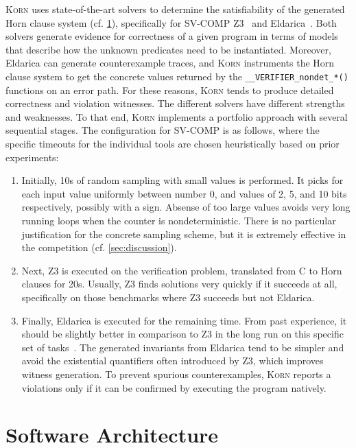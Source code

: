 \documentclass{llncs}
\newcommand{\Korn}{\textsc{Korn}\xspace}
\begin{document}
\Korn uses state-of-the-art solvers to determine the satisfiability of the generated Horn clause system (cf. \cref{sec:architecture}),
specifically for SV-COMP Z3~\cite{bjorner2013solving} and Eldarica~\cite{hojjat2018eldarica}.
Both solvers generate evidence for correctness of a given program in terms of models that describe how the unknown predicates need to be instantiated.
Moreover, Eldarica can generate counterexample traces, and \Korn instruments the Horn clause system to get
the concrete values returned by the \texttt{\_\_VERIFIER\_nondet\_*()} functions on an error path.
For these reasons, \Korn tends to produce detailed correctness and violation witnesses.
%
The different solvers have different strengths and weaknesses.
To that end, \Korn implements a portfolio approach with several sequential stages.
The configuration for SV-COMP is as follows,
where the specific timeouts for the individual tools are chosen heuristically based
on prior experiments:
\begin{enumerate}
    \item Initially, 10s of random sampling with small values is performed.
          It picks for each input value uniformly between number 0, and values of 2, 5, and 10 bits respectively, possibly with a sign.
          Absense of too large values avoids very long running loops
          when the counter is nondeterministic.
          There is no particular justification for the concrete sampling scheme,
          but it is extremely effective in the competition (cf. \cref{sec:discussion}).
    \item Next, Z3 is executed on the verification problem, translated from C to Horn clauses for 20s. Usually, Z3 finds solutions very quickly if it succeeds at all,
          specifically on those benchmarks where Z3 succeeds but not Eldarica.
    \item Finally, Eldarica is executed for the remaining time.
          From past experience, it should be slightly better in comparison to Z3 in the long run on this specific set of tasks~\cite{ernst:arxiv2020:summaries}.
    The generated invariants from Eldarica tend to be simpler and avoid the existential quantifiers
    often introduced by Z3, which improves witness generation.
    To prevent spurious counterexamples,
    \Korn reports a violations only if it can be confirmed by executing the program natively.
\end{enumerate}

\section{Software Architecture}
\label{sec:architecture}
\end{document}
